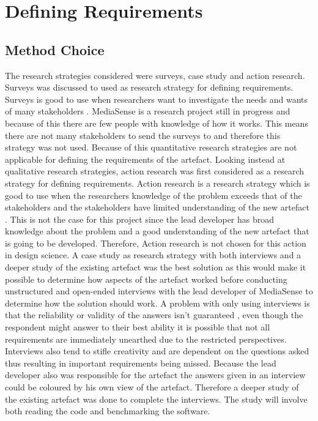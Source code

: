 \section{Defining Requirements}
\subsection{Method Choice}
The research strategies considered were surveys, case study and action research. Surveys was discussed to used as research strategy for defining requirements. Surveys is good to use when researchers want to investigate the needs and wants of many stakeholders \cite{johannesson2012design}. MediaSense is a research project still in progress and because of this there are few people with knowledge of how it works. This means there are not many stakeholders to send the surveys to and therefore this strategy was not used. Because of this quantitative research strategies are not applicable for defining the requirements of the artefact. 
Looking instead at qualitative research strategies, action research was first considered as a research strategy for defining requirements. Action research is a research strategy which is good to use when the researchers knowledge of the problem exceeds that of the stakeholders and the stakeholders have limited understanding of the new artefact \cite{johannesson2012design}. This is not the case for this project since the lead developer has broad knowledge about the problem and a good understanding of the new artefact that is going to be developed. Therefore, Action research is not chosen for this action in design science. 
A case study as research strategy with both interviews and a deeper study of the existing artefact was the best solution as this would make it possible to determine how aspects of the artefact worked before conducting unstructured and open-ended interviews with the lead developer of MediaSense to determine how the solution should work. A problem with only using interviews is that the reliability or validity of the answers isn't guaranteed \cite{golafshani2003understanding}, even though the respondent might answer to their best ability it is possible that not all requirements are immediately unearthed due to the restricted perspectives. Interviews also tend to stifle creativity and are dependent on the questions asked \cite{johannesson2012design} thus resulting in important requirements being missed. Because the lead developer also was responsible for the artefact the answers given in an interview could be coloured by his own view of the artefact. Therefore a deeper study of the existing artefact was done to complete the interviews. The study will involve both reading the code and benchmarking the software.

